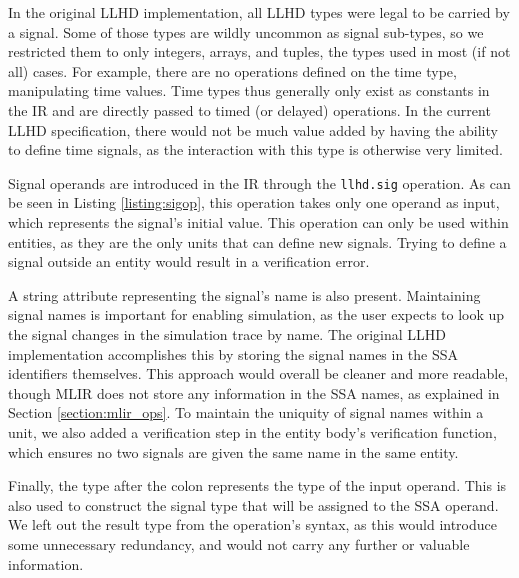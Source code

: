 In the original LLHD implementation, all LLHD types were legal to be carried by a signal. Some of those types are wildly uncommon as signal sub-types, so we restricted them to only integers, arrays, and tuples, the types used in most (if not all) cases. For example, there are no operations defined on the time type, manipulating time values. Time types thus generally only exist as constants in the IR and are directly passed to timed (or delayed) operations. In the current LLHD specification, there would not be much value added by having the ability to define time signals, as the interaction with this type is otherwise very limited.

Signal operands are introduced in the IR through the \texttt{llhd.sig} operation. As can be seen in Listing \ref{listing:sigop}, this operation takes only one operand as input, which represents the signal's initial value. This operation can only be used within entities, as they are the only units that can define new signals. Trying to define a signal outside an entity would result in a verification error.

A string attribute representing the signal's name is also present. Maintaining signal names is important for enabling simulation, as the user expects to look up the signal changes in the simulation trace by name. The original LLHD implementation accomplishes this by storing the signal names in the SSA identifiers themselves. This approach would overall be cleaner and more readable, though MLIR does not store any information in the SSA names, as explained in Section \ref{section:mlir_ops}. To maintain the uniquity of signal names within a unit, we also added a verification step in the entity body's verification function, which ensures no two signals are given the same name in the same entity.

Finally, the type after the colon represents the type of the input operand. This is also used to construct the signal type that will be assigned to the SSA operand. We left out the result type from the operation's syntax, as this would introduce some unnecessary redundancy, and would not carry any further or valuable information.

